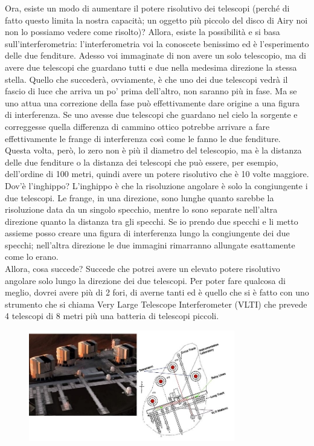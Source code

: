 \documentclass[a4paper,11pt]{article}
\begin{document}
Ora, esiste un modo di aumentare il potere risolutivo dei telescopi (perché di fatto questo limita la nostra capacità; un oggetto più piccolo del disco di Airy noi non lo possiamo vedere come risolto)? Allora, esiste la possibilità e si basa sull’interferometria: l’interferometria voi la conoscete benissimo ed è l’esperimento delle due fenditure. Adesso voi immaginate di non avere un solo telescopio, ma di avere due telescopi che guardano tutti e due nella medesima direzione la stessa stella. Quello che succederà, ovviamente, è che uno dei due telescopi vedrà il fascio di luce che arriva un po’ prima dell’altro, non saranno più in fase. Ma se uno attua una correzione della fase può effettivamente dare origine a una figura di interferenza. Se uno avesse due telescopi che guardano nel cielo la sorgente e correggesse quella differenza di cammino ottico potrebbe arrivare a fare effettivamente le frange di interferenza così come le fanno le due fenditure. Questa volta, però, lo zero non è più il diametro del telescopio, ma è la distanza delle due fenditure o la distanza dei telescopi che può essere, per esempio, dell’ordine di 100 metri, quindi avere un potere risolutivo che è 10 volte maggiore. 
\\Dov’è l’inghippo? L’inghippo è che la risoluzione angolare è solo la congiungente i due telescopi. Le frange, in una direzione, sono lunghe quanto sarebbe la risoluzione data da un singolo specchio, mentre lo sono separate nell’altra direzione quanto la distanza tra gli specchi. Se io prendo due specchi e li metto assieme posso creare una figura di interferenza lungo la congiungente dei due specchi; nell’altra direzione le due immagini rimarranno allungate esattamente come lo erano. 
\\Allora, cosa succede? Succede che potrei avere un elevato potere risolutivo angolare solo lungo la direzione dei due telescopi. Per poter fare qualcosa di meglio, dovrei avere più di 2 fori, di averne tanti ed è quello che si è fatto con uno strumento che si chiama Very Large Telescope Interferometer (VLTI) che prevede 4 telescopi di 8 metri più una batteria di telescopi piccoli.
\begin{figure}[h!!]
        \centering
        \includegraphics[width=9cm]{30.jpg}
        \label{}
    \end{figure}
\end{document}
